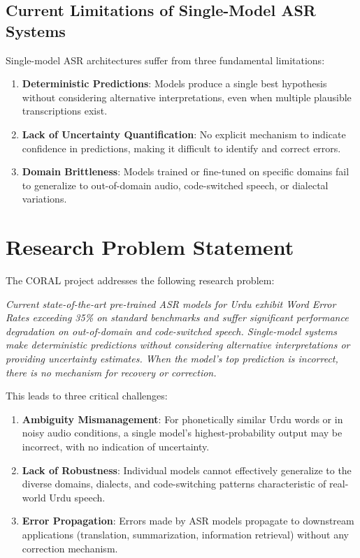 \subsection{Current Limitations of Single-Model ASR Systems}

Single-model ASR architectures suffer from three fundamental limitations:

\begin{enumerate}
    \item \textbf{Deterministic Predictions}: Models produce a single best hypothesis without considering alternative interpretations, even when multiple plausible transcriptions exist.
    
    \item \textbf{Lack of Uncertainty Quantification}: No explicit mechanism to indicate confidence in predictions, making it difficult to identify and correct errors.
    
    \item \textbf{Domain Brittleness}: Models trained or fine-tuned on specific domains fail to generalize to out-of-domain audio, code-switched speech, or dialectal variations.
\end{enumerate}

\section{Research Problem Statement}

The CORAL project addresses the following research problem:

\textit{Current state-of-the-art pre-trained ASR models for Urdu exhibit Word Error Rates exceeding 35\% on standard benchmarks and suffer significant performance degradation on out-of-domain and code-switched speech. Single-model systems make deterministic predictions without considering alternative interpretations or providing uncertainty estimates. When the model's top prediction is incorrect, there is no mechanism for recovery or correction.}

This leads to three critical challenges:

\begin{enumerate}
    \item \textbf{Ambiguity Mismanagement}: For phonetically similar Urdu words or in noisy audio conditions, a single model's highest-probability output may be incorrect, with no indication of uncertainty.
    
    \item \textbf{Lack of Robustness}: Individual models cannot effectively generalize to the diverse domains, dialects, and code-switching patterns characteristic of real-world Urdu speech.
    
    \item \textbf{Error Propagation}: Errors made by ASR models propagate to downstream applications (translation, summarization, information retrieval) without any correction mechanism.
\end{enumerate}

